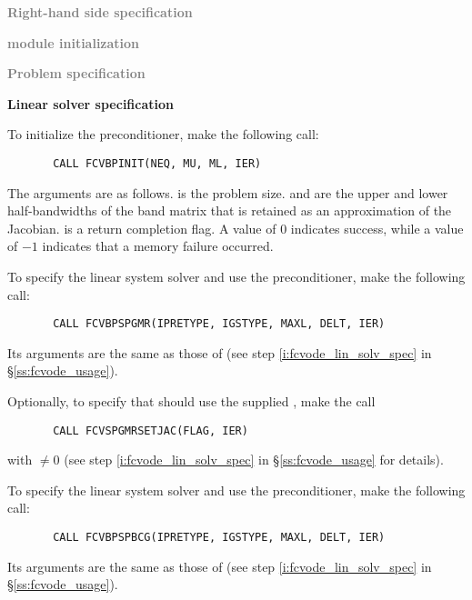 \begin{Steps}
  
\item \textcolor{gray}{\bf Right-hand side specification}

\item \textcolor{gray}{\bf {\nvector} module initialization}

\item \textcolor{gray}{\bf Problem specification}

\item {\bf Linear solver specification}

  To initialize the {\cvbandpre} preconditioner, make the following call:
\begin{verbatim}
       CALL FCVBPINIT(NEQ, MU, ML, IER)
\end{verbatim}
  The arguments are as follows.
   is the problem size.
   and  are the upper and lower half-bandwidths of the band matrix
  that  is retained as an approximation of the Jacobian.
   is a return completion flag.  A value of $0$ indicates success, while 
  a value of $-1$ indicates that a memory failure occurred.
  
  To specify the {\spgmr} linear system solver and use the {\cvbandpre}
  preconditioner, make the following call:
\begin{verbatim}
       CALL FCVBPSPGMR(IPRETYPE, IGSTYPE, MAXL, DELT, IER)
\end{verbatim}
  Its arguments are the same as those of 
  (see step \ref{i:fcvode_lin_solv_spec} in \S\ref{ss:fcvode_usage}).
  
  Optionally, to specify that {\spgmr} should use the supplied , 
  make the call
\begin{verbatim}
       CALL FCVSPGMRSETJAC(FLAG, IER)
\end{verbatim}
  with  $\neq 0$ 
  (see step \ref{i:fcvode_lin_solv_spec} in \S\ref{ss:fcvode_usage} for details).
  

  To specify the {\spbcg} linear system solver and use the {\cvbandpre}
  preconditioner, make the following call:
\begin{verbatim}
       CALL FCVBPSPBCG(IPRETYPE, IGSTYPE, MAXL, DELT, IER)
\end{verbatim}
  Its arguments are the same as those of 
  (see step \ref{i:fcvode_lin_solv_spec} in \S\ref{ss:fcvode_usage}).
  

\end{Steps}
